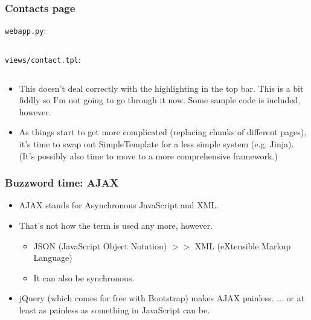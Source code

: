 \documentclass{beamer}
\begin{document}
\begin{frame}
  \frametitle{Contacts page}
  \texttt{webapp.py}:
  \inputminted[firstline=34,lastline=38]{python}{../steps/03-frontend/02-demo-app/webapp.py}
  \texttt{views/contact.tpl}:
  \inputminted{html}{../steps/03-frontend/02-demo-app/views/contact.tpl}
\end{frame}

\begin{frame}
  \begin{itemize}
  \item This doesn't deal correctly with the highlighting in the top
    bar. This is a bit fiddly so I'm not going to go through it
    now. Some sample code is included, however.
  \item As things start to get more complicated (replacing chunks of
    different pages), it's time to swap out SimpleTemplate for a less
    simple system (e.g. Jinja). (It's possibly also time to move to a
    more comprehensive framework.)
  \end{itemize}
\end{frame}

\begin{frame}
  \frametitle{Buzzword time: AJAX}
  \begin{itemize}
  \item AJAX stands for Asynchronous JavaScript and XML.
  \item That's not how the term is used any more, however.
    \begin{itemize}
    \item JSON (JavaScript Object Notation) $>>$ XML (eXtensible
      Markup Language)
    \item It can also be synchronous.
    \end{itemize}
  \item jQuery (which comes for free with Bootstrap) makes AJAX
    painless. {\small ... or at least as painless as something in JavaScript can be.}
  \end{itemize}
\end{frame}
\end{document}
